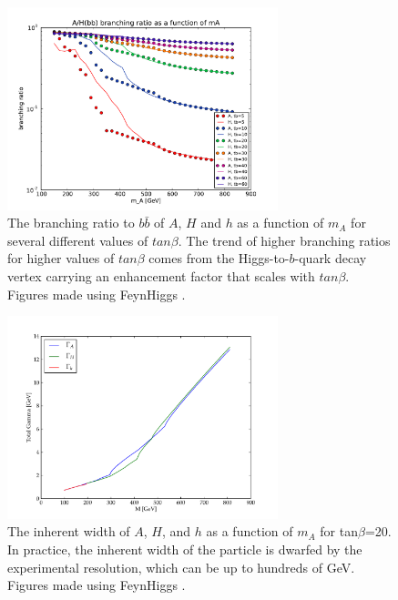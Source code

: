 \begin{figure}
	\centering
	\includegraphics[width=0.7\textwidth]{Theory/figures/mssm_xsec/AH_br_vs_mass.pdf}
	\caption{The branching ratio to $b\bar{b}$ of $A$, $H$ 
    and $h$ as a function of $m_A$ for 
    several different values of $tan\beta$. The trend of higher branching 
    ratios for higher values of $tan\beta$ comes from the Higgs-to-$b$-quark 
    decay vertex carrying an enhancement factor that scales with $tan\beta$.
    Figures made using FeynHiggs \cite{feynhiggs_1, feynhiggs_2, feynhiggs_3, feynhiggs_4, feynhiggs_5}. 
    \label{fig:br_vs_mass} }
\end{figure}


\begin{figure}
	\centering
	\includegraphics[width=0.7\textwidth]{Theory/figures/gamma.pdf}
	\caption{The inherent width of $A$, $H$, and $h$ 
    as a function of $m_A$ for tan$\beta$=20.  
    In practice, the inherent width of the particle is dwarfed by the experimental 
    resolution, which can be up to hundreds of GeV.  
    Figures made using FeynHiggs \cite{feynhiggs_1, feynhiggs_2, feynhiggs_3, feynhiggs_4, feynhiggs_5}. \label{fig:width}}
\end{figure}



